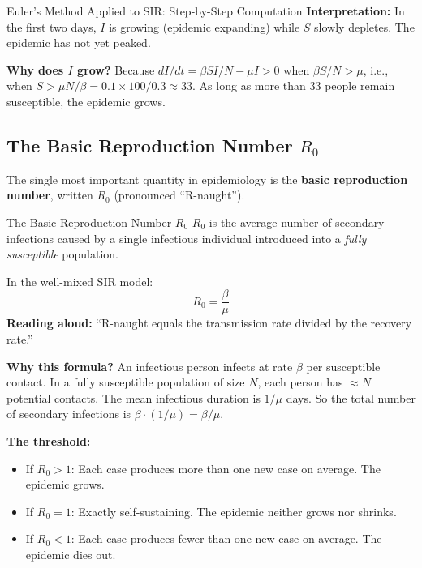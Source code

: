 \begin{examplebox}{Euler's Method Applied to SIR: Step-by-Step Computation}
\textbf{Interpretation:} In the first two days, $I$ is growing (epidemic expanding) while $S$ slowly depletes. The epidemic has not yet peaked.

\medskip
\textbf{Why does $I$ grow?} Because $dI/dt = \beta SI/N - \mu I > 0$ when $\beta S/N > \mu$, i.e., when $S > \mu N/\beta = 0.1 \times 100/0.3 \approx 33$. As long as more than 33 people remain susceptible, the epidemic grows.
\end{examplebox}

\subsection{The Basic Reproduction Number $R_0$}

The single most important quantity in epidemiology is the \textbf{basic reproduction number}, written $R_0$ (pronounced ``R-naught'').

\begin{conceptbox}{The Basic Reproduction Number $R_0$}
$R_0$ is the average number of secondary infections caused by a single infectious individual introduced into a \emph{fully susceptible} population.

In the well-mixed SIR model:
\begin{equation}
    R_0 = \frac{\beta}{\mu}
    \label{eq:r0}
\end{equation}
\textbf{Reading aloud:} ``R-naught equals the transmission rate divided by the recovery rate.''

\textbf{Why this formula?} An infectious person infects at rate $\beta$ per susceptible contact. In a fully susceptible population of size $N$, each person has $\approx N$ potential contacts. The mean infectious duration is $1/\mu$ days. So the total number of secondary infections is $\beta \cdot (1/\mu) = \beta/\mu$.

\textbf{The threshold:}
\begin{itemize}[noitemsep]
    \item If $R_0 > 1$: Each case produces more than one new case on average. The epidemic grows.
    \item If $R_0 = 1$: Exactly self-sustaining. The epidemic neither grows nor shrinks.
    \item If $R_0 < 1$: Each case produces fewer than one new case on average. The epidemic dies out.
\end{itemize}
\end{conceptbox}

